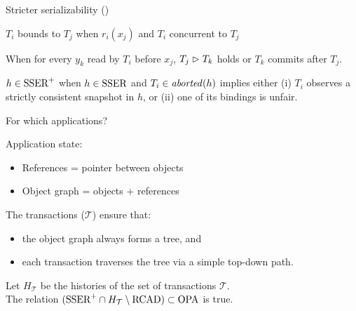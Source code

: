 \begin{frame}{Stricter serializability (\SPSER)}

  \begin{definition}[Binding]
    $T_i$ bounds to $T_j$ when $r_i(x_j)$ and $T_i$ concurrent to $T_j$
  \end{definition}

  \pause
  \smallskip
  
  \begin{definition}
    When for every $y_k$ read by $T_i$ before $x_j$, $T_j \depends T_k$ holds or $T_k$ commits after $T_j$.
  \end{definition}

  \pause
  \smallskip

  \begin{definition}
    $h \in \SPSER$ when $h \in \SSER$ and $T_i \in \aborted{h}$ implies either 
    (i) $T_i$ observes a strictly consistent snapshot in $h$, or (ii) one of its bindings is unfair.
  \end{definition}
  
\end{frame}

\begin{frame}{For which applications?}

  Application state:
  \begin{itemize}
  \item References = pointer between objects
  \item Object graph = objects + references
  \end{itemize}

  \bigskip

  The transactions ($\mathcal{T}$) ensure that:
  \begin{itemize}
  \item the object graph always forms a tree, and
  \item each transaction traverses the tree via a simple top-down path.
  \end{itemize}

  \bigskip
  
  \begin{theorem*}
    Let $H_{\mathcal{T}}$ be the histories of the set of transactions $\mathcal{T}$.\\
    The relation $(\SPSER \inter H_{\mathcal{T}} \setminus \RCAD) \subset \OPA$ is true.\footnotemark
  \end{theorem*}


\end{frame}

